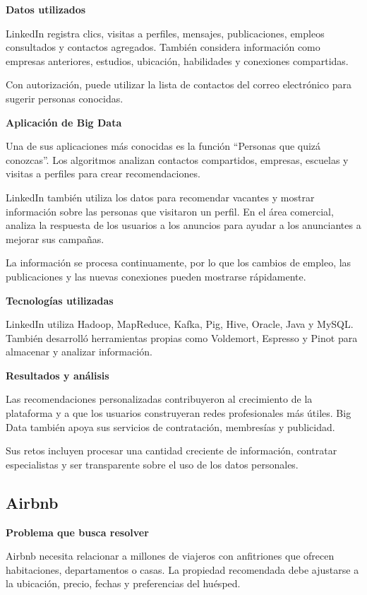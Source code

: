 \textbf{Datos utilizados}

LinkedIn registra clics, visitas a perfiles, mensajes, publicaciones, empleos consultados y contactos agregados. También considera información como empresas anteriores, estudios, ubicación, habilidades y conexiones compartidas.

Con autorización, puede utilizar la lista de contactos del correo electrónico para sugerir personas conocidas.

\textbf{Aplicación de Big Data}

Una de sus aplicaciones más conocidas es la función ``Personas que quizá conozcas''. Los algoritmos analizan contactos compartidos, empresas, escuelas y visitas a perfiles para crear recomendaciones.

LinkedIn también utiliza los datos para recomendar vacantes y mostrar información sobre las personas que visitaron un perfil. En el área comercial, analiza la respuesta de los usuarios a los anuncios para ayudar a los anunciantes a mejorar sus campañas.

La información se procesa continuamente, por lo que los cambios de empleo, las publicaciones y las nuevas conexiones pueden mostrarse rápidamente.

\textbf{Tecnologías utilizadas}

LinkedIn utiliza Hadoop, MapReduce, Kafka, Pig, Hive, Oracle, Java y MySQL. También desarrolló herramientas propias como Voldemort, Espresso y Pinot para almacenar y analizar información.

\textbf{Resultados y análisis}

Las recomendaciones personalizadas contribuyeron al crecimiento de la plataforma y a que los usuarios construyeran redes profesionales más útiles. Big Data también apoya sus servicios de contratación, membresías y publicidad.

Sus retos incluyen procesar una cantidad creciente de información, contratar especialistas y ser transparente sobre el uso de los datos personales.

\subsection{Airbnb}

\textbf{Problema que busca resolver}

Airbnb necesita relacionar a millones de viajeros con anfitriones que ofrecen habitaciones, departamentos o casas. La propiedad recomendada debe ajustarse a la ubicación, precio, fechas y preferencias del huésped.

